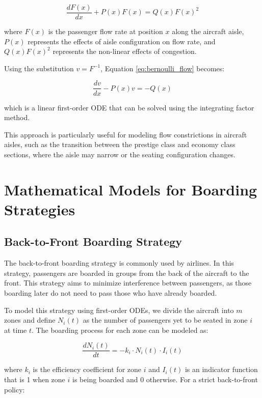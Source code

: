 \documentclass[12pt,a4paper]{article}
\begin{document}
\begin{equation}
\frac{dF(x)}{dx} + P(x)F(x) = Q(x)F(x)^2
\label{eq:bernoulli_flow}
\end{equation}

where $F(x)$ is the passenger flow rate at position $x$ along the aircraft aisle, $P(x)$ represents the effects of aisle configuration on flow rate, and $Q(x)F(x)^2$ represents the non-linear effects of congestion.

Using the substitution $v = F^{-1}$, Equation \ref{eq:bernoulli_flow} becomes:

\begin{equation}
\frac{dv}{dx} - P(x)v = -Q(x)
\label{eq:transformed_bernoulli}
\end{equation}

which is a linear first-order ODE that can be solved using the integrating factor method.

This approach is particularly useful for modeling flow constrictions in aircraft aisles, such as the transition between the prestige class and economy class sections, where the aisle may narrow or the seating configuration changes.

\section{Mathematical Models for Boarding Strategies}
\subsection{Back-to-Front Boarding Strategy}

The back-to-front boarding strategy is commonly used by airlines. In this strategy, passengers are boarded in groups from the back of the aircraft to the front. This strategy aims to minimize interference between passengers, as those boarding later do not need to pass those who have already boarded.

To model this strategy using first-order ODEs, we divide the aircraft into $m$ zones and define $N_i(t)$ as the number of passengers yet to be seated in zone $i$ at time $t$. The boarding process for each zone can be modeled as:

\begin{equation}
\frac{dN_i(t)}{dt} = -k_i \cdot N_i(t) \cdot I_i(t)
\label{eq:zone_boarding}
\end{equation}

where $k_i$ is the efficiency coefficient for zone $i$ and $I_i(t)$ is an indicator function that is 1 when zone $i$ is being boarded and 0 otherwise. For a strict back-to-front policy:
\end{document}
